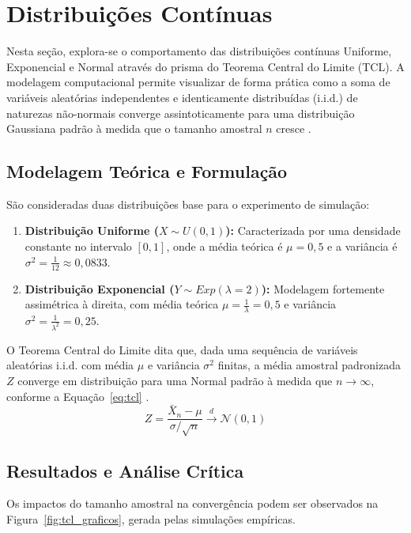 \section{Distribuições Contínuas}
Nesta seção, explora-se o comportamento das distribuições contínuas Uniforme, Exponencial e Normal através do prisma do Teorema Central do Limite (TCL). A modelagem computacional permite visualizar de forma prática como a soma de variáveis aleatórias independentes e identicamente distribuídas (i.i.d.) de naturezas não-normais converge assintoticamente para uma distribuição Gaussiana padrão à medida que o tamanho amostral $n$ cresce \cite{ross2010probabilidade}.

\subsection{Modelagem Teórica e Formulação}

São consideradas duas distribuições base para o experimento de simulação:
\begin{enumerate}
    \item \textbf{Distribuição Uniforme ($X \sim U(0, 1)$):} Caracterizada por uma densidade constante no intervalo $[0, 1]$, onde a média teórica é $\mu = 0{,}5$ e a variância é $\sigma^2 = \frac{1}{12} \approx 0{,}0833$.
    \item \textbf{Distribuição Exponencial ($Y \sim Exp(\lambda = 2)$):} Modelagem fortemente assimétrica à direita, com média teórica $\mu = \frac{1}{\lambda} = 0{,}5$ e variância $\sigma^2 = \frac{1}{\lambda^2} = 0{,}25$.
\end{enumerate}

O Teorema Central do Limite dita que, dada uma sequência de variáveis aleatórias i.i.d. com média $\mu$ e variância $\sigma^2$ finitas, a média amostral padronizada $Z$ converge em distribuição para uma Normal padrão à medida que $n \to \infty$, conforme a Equação~\ref{eq:tcl} \cite{chan2021probability}.
\begin{equation}
    Z = \frac{\bar{X}_n - \mu}{\sigma / \sqrt{n}} \xrightarrow{d} \mathcal{N}(0, 1)
    \label{eq:tcl}
\end{equation}

\subsection{Resultados e Análise Crítica}

Os impactos do tamanho amostral na convergência podem ser observados na Figura~\ref{fig:tcl_graficos}, gerada pelas simulações empíricas.


